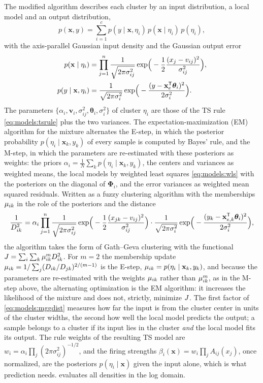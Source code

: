 The modified algorithm \cite{abonyi:2002:mgg} describes each cluster by an input distribution, a local model and an output distribution,
\begin{equation}
  p(\mathbf{x},y)=\sum_{i=1}^{c}p(y\mid\mathbf{x},\eta_i)\,p(\mathbf{x}\mid\eta_i)\,p(\eta_i),
  \label{eq:models:mixture}
\end{equation}
with the axis-parallel Gaussian input density and the Gaussian output error
\begin{align}
  p(\mathbf{x}\mid\eta_i)&=\prod_{j=1}^{n}\frac{1}{\sqrt{2\pi\sigma^2_{ij}}}\exp\!\Big(-\frac12\frac{(x_j-v_{ij})^2}{\sigma^2_{ij}}\Big),
  \label{eq:models:densities}\\
  p(y\mid\mathbf{x},\eta_i)&=\frac{1}{\sqrt{2\pi\sigma^2_i}}\exp\!\Big(-\frac{(y-\mathbf{x}_e^{\mathsf{T}}\boldsymbol\theta_i)^2}{2\sigma^2_i}\Big).
  \label{eq:models:outputdensity}
\end{align}
The parameters $\{\alpha_i,\mathbf{v}_i,\sigma^2_{ij},\boldsymbol\theta_i,\sigma^2_i\}$ of cluster $\eta_i$ are those of the TS rule \eqref{eq:models:tsrule} plus the two variances. The expectation-maximization (EM) algorithm for the mixture alternates the E-step, in which the posterior probability $p(\eta_i\mid\mathbf{x}_k,y_k)$ of every sample is computed by Bayes' rule, and the M-step, in which the parameters are re-estimated with these posteriors as weights: the priors $\alpha_i=\frac1N\sum_k p(\eta_i\mid\mathbf{x}_k,y_k)$, the centers and variances as weighted means, the local models by weighted least squares \eqref{eq:models:wls} with the posteriors on the diagonal of $\boldsymbol\Phi_i$, and the error variances as weighted mean squared residuals. Written as a fuzzy clustering algorithm with the memberships $\mu_{ik}$ in the role of the posteriors and the distance
\begin{equation}
  \frac{1}{D^2_{ik}}=\alpha_i\prod_{j=1}^{n}\frac{1}{\sqrt{2\pi\sigma^2_{ij}}}\exp\!\Big(-\frac12\frac{(x_{jk}-v_{ij})^2}{\sigma^2_{ij}}\Big)\cdot
  \frac{1}{\sqrt{2\pi\sigma^2_i}}\exp\!\Big(-\frac{(y_k-\mathbf{x}_{e,k}^{\mathsf{T}}\boldsymbol\theta_i)^2}{2\sigma^2_i}\Big),
  \label{eq:models:mggdist}
\end{equation}
the algorithm takes the form of Gath--Geva clustering with the functional $J=\sum_i\sum_k\mu_{ik}^m D^2_{ik}$. For $m=2$ the membership update $\mu_{ik}=1/\sum_j(D_{ik}/D_{jk})^{2/(m-1)}$ is the E-step, $\mu_{ik}=p(\eta_i\mid\mathbf{x}_k,y_k)$, and because the parameters are re-estimated with the weights $\mu_{ik}$ rather than $\mu_{ik}^m$, as in the M-step above, the alternating optimization is the EM algorithm: it increases the likelihood of the mixture and does not, strictly, minimize $J$. The first factor of \eqref{eq:models:mggdist} measures how far the input is from the cluster center in units of the cluster widths, the second how well the local model predicts the output; a sample belongs to a cluster if its input lies in the cluster \emph{and} the local model fits its output. The rule weights of the resulting TS model are $w_i=\alpha_i\prod_j(2\pi\sigma^2_{ij})^{-1/2}$, and the firing strengths $\beta_i(\mathbf{x})=w_i\prod_jA_{ij}(x_j)$, once normalized, are the posteriors $p(\eta_i\mid\mathbf{x})$ given the input alone, which is what prediction needs.  evaluates all densities in the log domain.

